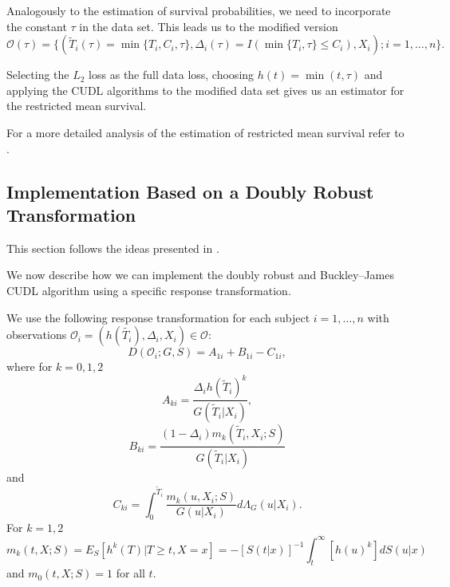 \documentclass[12pt, a4paper]{scrartcl}
\theoremstyle{definition}
\theoremstyle{plain}
\numberwithin{equation}{section}
\numberwithin{figure}{section}
\numberwithin{table}{section}
\begin{document}
	Analogously to the estimation of survival probabilities, we need to incorporate the constant $\tau$ in the data set.
	This leads us to the modified version	
	\begin{equation*}
		\mathcal{O}(\tau) = \{(\tilde{T}_i(\tau) = \min\{T_i, C_i, \tau\}, \Delta_i(\tau) = I(\min\{T_i, \tau\}\leq C_i), X_i); i = 1, \dots , n\}.
	\end{equation*}
	
	Selecting the $L_2$ loss as the full data loss, choosing $h(t) = \min(t,\tau)$ and applying the CUDL algorithms to the modified data set gives us an estimator for the restricted mean survival.
	
	For a more detailed analysis of the estimation of restricted mean survival refer to \citet*{strawderman}. 
	
	\subsection{Implementation Based on a Doubly Robust Transformation}\label{trafo}

	This section follows the ideas presented in \citet*{basearticle}.
	
	We now describe how we can implement the doubly robust and Buckley--James CUDL algorithm using a specific response transformation.
	
		
	We use the following response transformation for each subject $i=1,\dots,n$ with observations $\mathcal{O}_i = (h(\tilde{T_i}), \Delta_i, X_i) \in \mathcal{O}$:
	\begin{equation*}
	D(\mathcal O_i; G,S) = A_{1i}+B_{1i} - C_{1i},
	\end{equation*}
	where for $k=0,1,2$
	\begin{equation*}
	A_{ki} = \frac{\Delta_i h(\tilde{T}_i)^k}{G(\tilde{T}_i\vert X_i)},
	\end{equation*}
	\begin{equation*}
	B_{ki} = \frac{(1-\Delta_i)m_k(\tilde{T}_i, X_i; S)}{G(\tilde{T}_i\vert X_i)}
	\end{equation*}
	and
	\begin{equation*}
	C_{ki} = \int_{0}^{\tilde{T}_i} \frac{m_k(u, X_i; S)}{G(u \vert X_i)}d\Lambda_G(u \vert X_i).
	\end{equation*}
	For $k=1,2$
	\begin{equation}\label{eq:condexp}
	m_k(t,X;S) = E_S[h^k(T) \vert T \geq t, X = x] = -[S(t\vert x)]^{-1} \int_{t}^{\infty}[h(u)^k]dS(u\vert x)
	\end{equation}
	and $m_0(t,X;S) = 1$ for all $t$.
	
\end{document}
